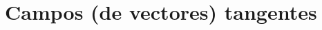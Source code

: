 \documentclass[../VD.tex]{subfiles}
\begin{document}
\setcounter{chapter}{5}
\chapter{Campos (de vectores) tangentes}\label{chap:campos}
\end{document}
